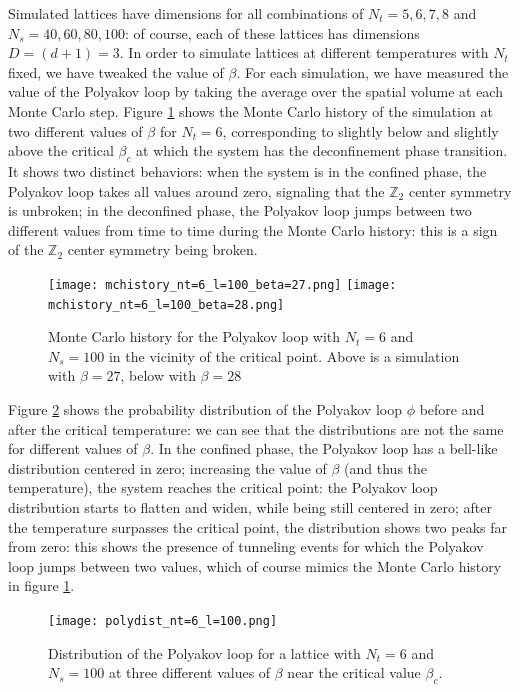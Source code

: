 \documentclass[reqno,12pt]{article}
\numberwithin{equation}{section}
\begin{document}
Simulated lattices have dimensions for all combinations of $N_t = 5, 6, 7, 8$ and $N_s = 40, 60, 80, 100$: of course,
each of these lattices has dimensions $D = (d+1) = 3$. In order to simulate lattices at different temperatures with
$N_t$ fixed, we have tweaked the value of $\beta$. For each simulation, we have measured the value of the Polyakov
loop by taking the average over the spatial volume at each Monte Carlo step. Figure \ref{fig:mchistory} shows
the Monte Carlo history of the simulation at two different values of $\beta$ for $N_t = 6$, 
corresponding to slightly below and slightly
above the critical $\beta_c$ at which the system has the deconfinement phase transition. It shows two distinct
behaviors: when the system is in the confined phase, the Polyakov loop takes all values around zero, signaling that
the $\mathbb{Z}_2$ center symmetry is unbroken; in the deconfined phase, the Polyakov loop jumps
between two different values from time to time during the Monte Carlo history: this is a sign of the $\mathbb{Z}_2$
center symmetry being broken. 

\begin{figure}[H]
	\centering
	\texttt{[image: mchistory\_nt=6\_l=100\_beta=27.png]}
	\texttt{[image: mchistory\_nt=6\_l=100\_beta=28.png]}
	\caption[Monte Carlo history]{Monte Carlo history for the Polyakov loop with $N_t = 6$ and $N_s = 100$ in the
	vicinity of the critical point. Above is a simulation with $\beta = 27$, below with $\beta = 28$}
	\label{fig:mchistory}
\end{figure}

Figure \ref{fig:polyloop_dist} shows the probability distribution of the Polyakov loop $\phi$ before
and after the critical temperature: we can see that the distributions are not the same for different values
of $\beta$. In the
confined phase, the Polyakov loop has a bell-like distribution centered in zero; increasing the value of
$\beta$ (and thus the temperature), the system reaches the critical point: the Polyakov loop distribution starts to
flatten and widen, while being still centered in zero; after the temperature surpasses the critical point, 
the distribution shows two peaks far from zero: this shows the presence of tunneling events for which
the Polyakov loop jumps between two values, which of course mimics the Monte Carlo history in figure \ref{fig:mchistory}.

\begin{figure}[h]
	\centering
	\texttt{[image: polydist\_nt=6\_l=100.png]}
	\caption[Polyakov loop distribution]{Distribution of the Polyakov loop for a lattice with $N_t = 6$ and
	$N_s = 100$ at three different values of $\beta$ near the critical value $\beta_c$.}
	\label{fig:polyloop_dist}
\end{figure}
\end{document}
